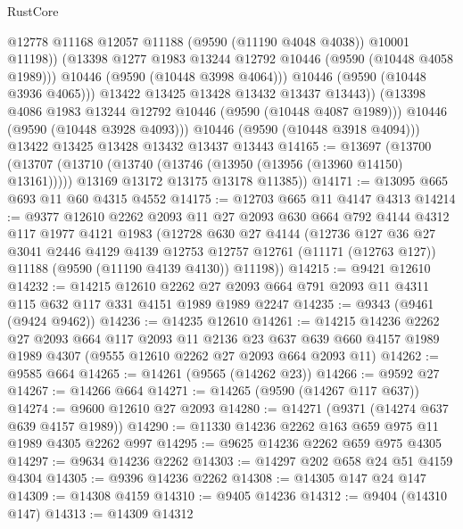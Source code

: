 \begin{lexlean}{RustCore}
\begin{coremodule}
                    @12778
                    @11168
                    @12057
                    @11188
                    (@9590 (@11190 @4048 @4038))
                    @10001
                    @11198))
                (@13398 @1277 @1983 @13244 @12792 @10446 (@9590 (@10448 @4058 @1989)))
                @10446
                (@9590 (@10448 @3998 @4064)))
              @10446
              (@9590 (@10448 @3936 @4065)))
            @13422
            @13425
            @13428
            @13432
            @13437
            @13443))
        (@13398 @4086 @1983 @13244 @12792 @10446 (@9590 (@10448 @4087 @1989)))
        @10446
        (@9590 (@10448 @3928 @4093)))
      @10446
      (@9590 (@10448 @3918 @4094)))
    @13422
    @13425
    @13428
    @13432
    @13437
    @13443
@14165 := @13697
    (@13700
      (@13707
        (@13710 (@13740 (@13746 (@13950 (@13956 (@13960 @14150) @13161)))))
        @13169
        @13172
        @13175
        @13178
        @11385))
@14171 := @13095 @665 @693 @11 @60 @4315 @4552
@14175 := @12703 @665 @11 @4147 @4313
@14214 := @9377
    @12610
    @2262
    @2093
    @11
    @27
    @2093
    @630
    @664
    @792
    @4144
    @4312
    @117
    @1977
    @4121
    @1983
    (@12728
      @630
      @27
      @4144
      (@12736
        @127
        @36
        @27
        @3041
        @2446
        @4129
        @4139
        @12753
        @12757
        @12761
        (@11171 (@12763 @127))
        @11188
        (@9590 (@11190 @4139 @4130))
        @11198))
@14215 := @9421 @12610
@14232 := @14215
    @12610
    @2262
    @27
    @2093
    @664
    @791
    @2093
    @11
    @4311
    @115
    @632
    @117
    @331
    @4151
    @1989
    @1989
    @2247
@14235 := @9343 (@9461 (@9424 @9462))
@14236 := @14235 @12610
@14261 := @14215
    @14236
    @2262
    @27
    @2093
    @664
    @117
    @2093
    @11
    @2136
    @23
    @637
    @639
    @660
    @4157
    @1989
    @1989
    @4307
    (@9555 @12610 @2262 @27 @2093 @664 @2093 @11)
@14262 := @9585 @664
@14265 := @14261 (@9565 (@14262 @23))
@14266 := @9592 @27
@14267 := @14266 @664
@14271 := @14265 (@9590 (@14267 @117 @637))
@14274 := @9600 @12610 @27 @2093
@14280 := @14271 (@9371 (@14274 @637 @639 @4157 @1989))
@14290 := @11330 @14236 @2262 @163 @659 @975 @11 @1989 @4305 @2262 @997
@14295 := @9625 @14236 @2262 @659 @975 @4305
@14297 := @9634 @14236 @2262
@14303 := @14297 @202 @658 @24 @51 @4159 @4304
@14305 := @9396 @14236 @2262
@14308 := @14305 @147 @24 @147
@14309 := @14308 @4159
@14310 := @9405 @14236
@14312 := @9404 (@14310 @147)
@14313 := @14309 @14312

\end{coremodule}
\end{lexlean}

